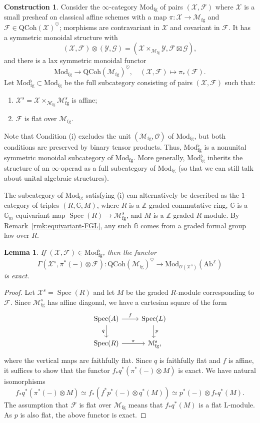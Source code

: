 \documentclass{amsart}
\numberwithin{equation}{section}
\theoremstyle{plain}
\newtheorem{lemma}[equation]{Lemma}
\theoremstyle{definition}
\newtheorem{construction}[equation]{Construction}
\let\scr=\mathcal
\let\bb=\mathbb
\def\Z{\bb Z}
\def\G{\mathbb G}
\def\ph{\mathord-}
\def\L{\mathrm{L}{}}
\DeclareMathOperator{\Spec}{Spec}
\def\QCoh{\mathrm{QCoh}{}}
\let\cat=\mathrm
\def\Mod{\cat{M}\mathrm{od}{}}
\def\Ab{\mathrm{A}\mathrm{b}}
\def\fg{\mathrm{fg}}
\let\heart=\heartsuit
\begin{document}
\begin{construction}\label{ctr:Mod-flat}
	Consider the $\infty$-category $\Mod_\fg$ of pairs $(\scr X,\scr F)$ where $\scr X$ is a small presheaf on classical affine schemes with a map $\pi\colon\scr X\to\scr M_\fg$ and $\scr F\in \QCoh(\scr X)^\heart$; morphisms are contravariant in $\scr X$ and covariant in $\scr F$. It has a symmetric monoidal structure with
	\[
	(\scr X,\scr F)\otimes(\scr Y,\scr G)=(\scr X\times_{\scr M_\fg}\scr Y,\scr F\boxtimes\scr G),
	\]
	and there is a lax symmetric monoidal functor
	\[
	\Mod_\fg\to\QCoh(\scr M_\fg)^\heart,\quad (\scr X,\scr F)\mapsto\pi_*(\scr F).
	\]	
	Let $\Mod_\fg^\flat\subset \Mod_\fg$ be the full subcategory consisting of pairs $(\scr X,\scr F)$ such that:
	\begin{enumerate}
		\item $\scr X^s=\scr X\times_{\scr M_\fg}\scr M_\fg^s$ is affine;
		\item $\scr F$ is flat over $\scr M_\fg$.
	\end{enumerate}
	Note that Condition (i) excludes the unit $(\scr M_\fg,\scr O)$ of $\Mod_\fg$, but both conditions are preserved by binary tensor products. Thus, $\Mod_\fg^\flat$ is a nonunital symmetric monoidal subcategory of $\Mod_\fg$. More generally, $\Mod_\fg^\flat$ inherits the structure of an $\infty$-operad as a full subcategory of $\Mod_\fg$ (so that we can still talk about unital algebraic structures).

	The subcategory of $\Mod_\fg$ satisfying (i) can alternatively be described as the $1$-category of triples $(R,\G,M)$, where $R$ is a $\Z$-graded commutative ring, $\G$ is a $\G_m$-equivariant map $\Spec(R)\to\scr M_\fg^s$, and $M$ is a $\Z$-graded $R$-module. By Remark~\ref{rmk:equivariant-FGL}, any such $\G$ comes from a graded formal group law over $R$.
\end{construction}

\begin{lemma}\label{lem:exact}
	If $(\scr X,\scr F)\in \Mod_\fg^\flat$, then the functor
	\[
	\Gamma(\scr X^s,\pi^*(\ph)\otimes \scr F)\colon \QCoh(\scr M_\fg)^\heart\to \Mod_{\scr O(\scr X^s)}(\Ab^\Z)
	\]
	is exact.
\end{lemma}

\begin{proof}
	Let $\scr X^s=\Spec(R)$ and let $M$ be the graded $R$-module corresponding to $\scr F$. Since $\scr M_\fg^s$ has affine diagonal, we have a cartesian square of the form
	\[
	\begin{tikzcd}
		\Spec(A) \ar{d}[swap]{q} \ar{r}{f} & \Spec(L) \ar{d}{p} \\
		\Spec(R) \ar{r}{\pi} & \scr M_\fg^s\rlap,
	\end{tikzcd}
	\]
	where the vertical maps are faithfully flat. Since $q$ is faithfully flat and $f$ is affine, it suffices to show that the functor $f_*q^*(\pi^*(\ph)\otimes M)$ is exact.
	We have natural isomorphisms
	\[
	 f_*q^*(\pi^*(\ph)\otimes M)\simeq  f_*(f^*p^*(\ph)\otimes q^*(M)) \simeq p^*(\ph)\otimes f_*q^*(M).
	\]
	The assumption that $\scr F$ is flat over $\scr M_\fg$ means that $f_*q^*(M)$ is a flat $\L$-module. As $p$ is also flat, the above functor is exact.
\end{proof}
\end{document}
